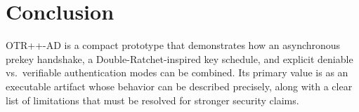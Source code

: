 \documentclass[11pt]{article}
\newcommand{\prot}{OTR++-AD}
\begin{document}
\section{Conclusion}
\prot{} is a compact prototype that demonstrates how an asynchronous prekey handshake, a Double-Ratchet-inspired key schedule, and explicit deniable vs.~verifiable authentication modes can be combined.
Its primary value is as an executable artifact whose behavior can be described precisely, along with a clear list of limitations that must be resolved for stronger security claims.



\end{document}
